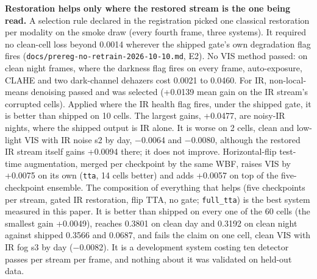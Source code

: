 \documentclass[10pt]{article}
\begin{document}
\textbf{Restoration helps only where the restored stream is the one being read.} A selection rule declared in the registration picked one classical restoration per modality on the smoke draw (every fourth frame, three systems). It required no clean-cell loss beyond 0.0014 wherever the shipped gate's own degradation flag fires (\texttt{docs/\allowbreak{}prereg-no-retrain-2026-10-10.md}, E2). No VIS method passed: on clean night frames, where the darkness flag fires on every frame, auto-exposure, CLAHE and two dark-channel dehazers cost 0.0021 to 0.0460. For IR, non-local-means denoising passed and was selected (+0.0139 mean gain on the IR stream's corrupted cells). Applied where the IR health flag fires, under the shipped gate, it is better than shipped on 10 cells. The largest gains, +0.0477, are noisy-IR nights, where the shipped output is IR alone. It is worse on 2 cells, clean and low-light VIS with IR noise s2 by day, $-$0.0064 and $-$0.0080, although the restored IR stream itself gains +0.0094 there; it does not improve. Horizontal-flip test-time augmentation, merged per checkpoint by the same WBF, raises VIS by +0.0075 on its own (\texttt{tta}, 14 cells better) and adds +0.0057 on top of the five-checkpoint ensemble. The composition of everything that helps (five checkpoints per stream, gated IR restoration, flip TTA, no gate; \texttt{full\_\allowbreak{}tta}) is the best system measured in this paper. It is better than shipped on every one of the 60 cells (the smallest gain +0.0049), reaches 0.3801 on clean day and 0.3192 on clean night against shipped 0.3566 and 0.0687, and fails the claim on one cell, clean VIS with IR fog s3 by day ($-$0.0082). It is a development system costing ten detector passes per stream per frame, and nothing about it was validated on held-out data.
\end{document}
